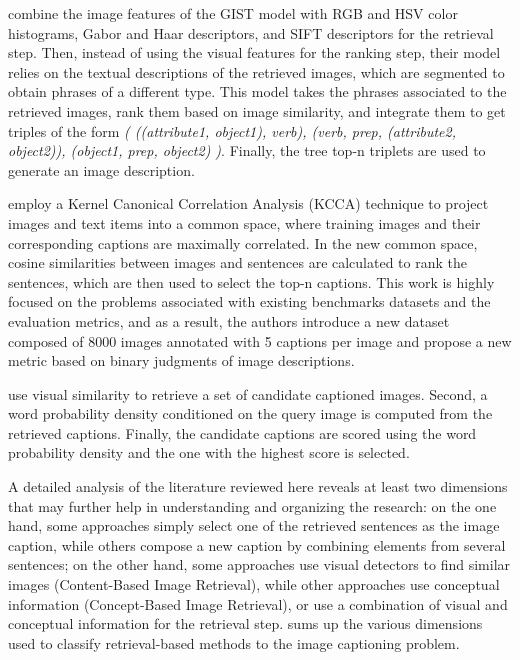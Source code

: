\citet{Gupta2012} combine the image features of the GIST model with RGB and HSV color histograms, Gabor and Haar descriptors, and SIFT \citep{Lowe2004} descriptors for the retrieval step. Then, instead of using the visual features for the ranking step, their model relies on the textual descriptions of the retrieved images, which are segmented to obtain phrases of a different type. This model takes the phrases associated to the retrieved images, rank them based on image similarity, and integrate them to get triples of the form \textit{( ((attribute1, object1), verb), (verb, prep, (attribute2, object2)), (object1, prep, object2) )}. Finally, the tree top-n triplets are used to generate an image description.

\citet{Hodosh2013b} employ a Kernel Canonical Correlation Analysis (KCCA) \citep{Bach2003} technique to project images and text items into a common space, where training images and their corresponding captions are maximally correlated. In the new common space, cosine similarities between images and sentences are calculated to rank the sentences, which are then used to select the top-n captions. This work is highly focused on the problems associated with existing benchmarks datasets and the evaluation metrics, and as a result, the authors introduce a new dataset composed of 8000 images annotated with 5 captions per image and propose a new metric based on binary judgments of image descriptions.

\citet{Mason2015} use visual similarity to retrieve a set of candidate captioned images. Second, a word probability density conditioned on the query image is computed from the retrieved captions. Finally, the candidate captions are scored using the word probability density and the one with the highest score is selected. 

A detailed analysis of the literature reviewed here reveals at least two dimensions that may further help in understanding and organizing the research: on the one hand, some approaches simply select one of the retrieved sentences as the image caption, while others compose a new caption by combining elements from several sentences; on the other hand, some approaches use visual detectors to find similar images (Content-Based Image Retrieval), while other approaches use conceptual information (Concept-Based Image Retrieval), or use a combination of visual and conceptual information for the retrieval step.  sums up the various dimensions used to classify retrieval-based methods to the image captioning problem.

